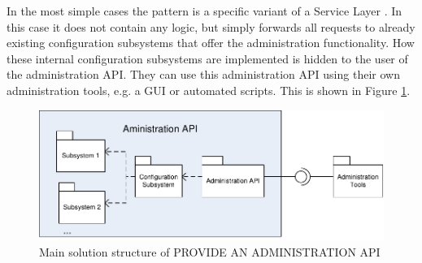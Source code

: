 

In the most simple cases the pattern is a specific variant of a {\sc Service Layer} \cite{Fowler:2002:PEA:579257}. In this case it does not contain any logic, but simply forwards all requests to already existing configuration subsystems that offer the administration functionality. How these internal configuration subsystems are implemented is hidden to the user of the administration API. They can use this administration API using their own administration tools, e.g. a GUI or automated scripts. This is shown in Figure \ref{fig:provideAPIDiagram-01}.  

\begin{figure}[h]
\centering
\includegraphics{patterns/provideAPIDiagram-01.pdf}
\caption{Main solution structure of PROVIDE AN ADMINISTRATION API}
\label{fig:provideAPIDiagram-01}
\end{figure}

